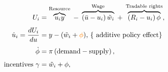 \documentclass[10pt]{article}
\begin{document}
\begin{align*}
U_i &= \overbrace{u_i y}^{\text{Resource}} \;-\; \overbrace{(\bar{u}-u_i)\,\tilde{w}_i}^{\text{Wage}} \;+\; \overbrace{(R_i - u_i)\,\phi}^{\text{Tradable rights}}, \\[4pt] 
 \dot{u}_i = \frac{dU_i}{du} &=  y - (\tilde{w}_i + \textcolor{orange}{\phi}) \text{,   \{ additive policy effect\}} \\[4pt]
\dot{\phi} &= \pi  \left( \text{demand} - \text{supply} \right),\\[4pt]
\text{incentives   }  \gamma &= \tilde{w}_i + \phi, 
 \end{align*}
\end{document}
